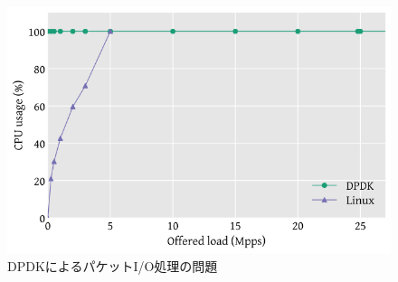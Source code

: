 \begin{figure}[htb]
  \centering
  \includegraphics[width=\columnwidth]{pictures/DPDKProblem.png}
  \caption{DPDKによるパケットI/O処理の問題}
  \label{fig:DPDKProblem}
\end{figure}
